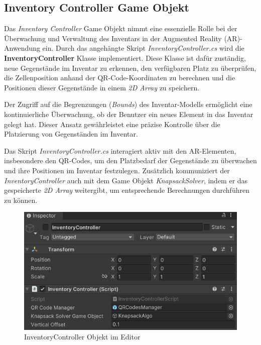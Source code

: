 \subsection{Inventory Controller Game Objekt}
Das \textit{Inventory Controller} Game Objekt nimmt eine essenzielle Rolle bei der Überwachung und Verwaltung des Inventars
in der Augmented Reality (AR)-Anwendung ein. Durch das angehängte Skript \textit{InventoryController.cs} wird die
\textbf{InventoryController} Klasse implementiert. Diese Klasse ist dafür zuständig, neue Gegenstände im Inventar zu
erkennen, den verfügbaren Platz zu überprüfen, die Zellenposition anhand der QR-Code-Koordinaten zu berechnen und die
Positionen dieser Gegenstände in einem \textit{2D Array} zu speichern.

Der Zugriff auf die Begrenzungen (\textit{Bounds}) des Inventar-Modells ermöglicht eine kontinuierliche Überwachung, ob
der Benutzer ein neues Element in das Inventar gelegt hat. Dieser Ansatz gewährleistet eine präzise Kontrolle über die
Platzierung von Gegenständen im Inventar.

Das Skript \textit{InventoryController.cs} interagiert aktiv mit den AR-Elementen, insbesondere den QR-Codes, um den
Platzbedarf der Gegenstände zu überwachen und ihre Positionen im Inventar festzulegen. Zusätzlich kommuniziert der
\textit{InventoryController} auch mit dem Game Objekt \textit{KnapsackSolver}, indem er das gespeicherte \textit{2D Array}
weitergibt, um entsprechende Berechnungen durchführen zu können.

\begin{figure}[h]
\centering
\includegraphics[scale=0.8]{images/invCon_Editor}
\caption{InventoryController Objekt im Editor}
\label{fig:InventoryController_Editor}
\end{figure}

